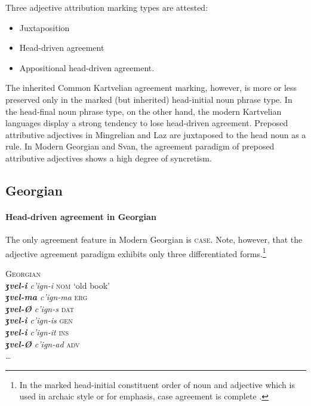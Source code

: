 \noindent Three adjective attribution marking types are attested:
\begin{itemize}
\item Juxtaposition
\item Head-driven agreement
\item Appositional head-driven agreement.
\end{itemize}
The inherited Common Kartvelian agreement marking, however, is more or less preserved only in the marked (but inherited) head-initial noun phrase type. In the head-final noun phrase type, on the other hand, the modern Kartvelian languages display a strong tendency to lose head-driven agreement. Preposed attributive adjectives in Mingrelian and Laz are juxtaposed to the head noun as a rule. In Modern Georgian and Svan, the agreement paradigm of preposed attributive adjectives shows a high degree of syncretism.

\subsection{Georgian}\label{georgian synchr}
\paragraph{Head-driven agreement in Georgian}
The only agreement feature in Modern Georgian is \textsc{case}. Note, however, that the adjective agreement paradigm exhibits only three differentiated forms.\footnote{In the marked head-initial constituent order of noun and adjective which is used in archaic style or for emphasis, case agreement is complete \citep[59]{tuite1998}.}
\begin{exe}
\ex \textsc{Georgian} \cite[236]{aronson1991}\\
\textit{\textbf{ʒvel-i} c'ign-i} \textsc{nom} ‘old book’\\
\textit{\textbf{ʒvel-ma} c'ign-ma} \textsc{erg}\\
\textit{\textbf{ʒvel-Ø} c'ign-s} \textsc{dat}\\
\textit{\textbf{ʒvel-i} c'ign-is} \textsc{gen}\\
\textit{\textbf{ʒvel-i} c'ign-it} \textsc{ins}\\
\textit{\textbf{ʒvel-Ø} c'ign-ad} \textsc{adv}\\
\dots \label{georgian old}
\end{exe}

